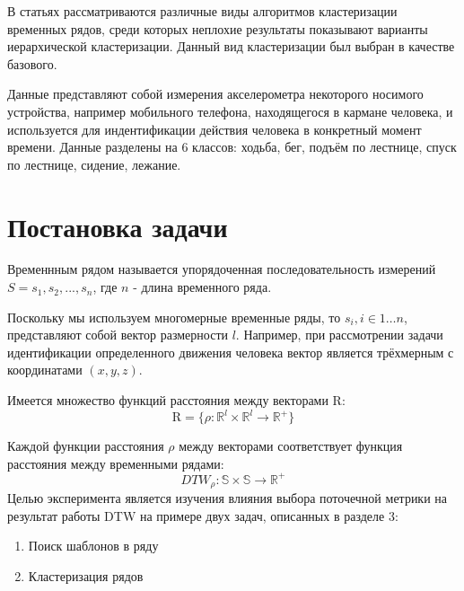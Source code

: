 \documentclass[12pt,twoside]{article}
\begin{document}
        В статьях \cite{WARRENLIAO20051857} \cite{AGHABOZORGI201516} рассматриваются различные виды алгоритмов кластеризации временных рядов,
        среди которых неплохие результаты показывают варианты иерархической кластеризации.
        Данный вид кластеризации был выбран в качестве базового.
        
        Данные \cite{Kwapisz:2011:ARU:1964897.1964918} представляют собой измерения акселерометра некоторого носимого устройства,
        например мобильного телефона, находящегося в кармане человека, и используется для индентификации действия человека в конкретный момент времени.
        Данные разделены на 6 классов: ходьба, бег, подъём по лестнице, спуск по лестнице, сидение, лежание.
        
        
    \section{Постановка задачи}\label{problem}
		
        Временнным рядом называется упорядоченная последовательность измерений\\
        $S = s_1,s_2,...,s_n$,
        где $n$ \-- длина временного ряда.
        
        Поскольку мы используем многомерные временные ряды, то $s_i, i \in 1\dots n$, представляют собой вектор размерности $l$.
        Например, при рассмотрении задачи идентификации определенного движения человека вектор является трёхмерным с координатами $(x, y, z)$.

        Имеется множество функций расстояния между векторами $\mathrm{R}$:
        $$
            \mathrm{R} = \{\rho: \mathbb{R}^l \times \mathbb{R}^l \rightarrow \mathbb{R}^+ \}
        $$
				
        Каждой функции расстояния $\rho$ между векторами соответствует функция расстояния между временными рядами:
        $$
            DTW_{\rho}: \mathbb{S} \times \mathbb{S} \rightarrow \mathbb{R}^+ 
        $$
        Целью эксперимента является изучения влияния выбора поточечной метрики на результат работы DTW на примере двух задач,
            описанных в разделе 3:
    
        \begin{enumerate}[label=\arabic*)]
            \item Поиск шаблонов в ряду
            \item Кластеризация рядов
        \end{enumerate}        
                
\end{document}
